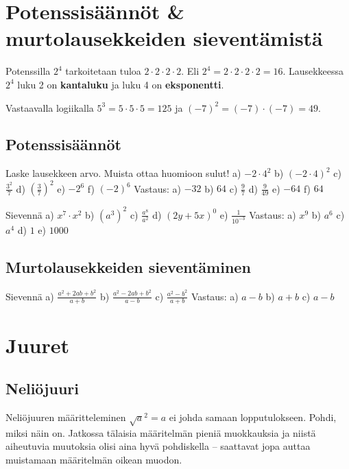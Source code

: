 \chapter{Potenssisäännöt \& murtolausekkeiden sieventämistä}
Potenssilla $2^4$ tarkoitetaan tuloa $2\cdot 2\cdot 2\cdot 2$. Eli $2^4=2\cdot 2\cdot 2\cdot 2=16$. Lausekkeessa $2^4$ luku 2 on \textbf{kantaluku} ja luku 4 on \textbf{eksponentti}.

Vastaavalla logiikalla $5^3=5\cdot 5\cdot 5=125$ ja $(-7)^2=(-7)\cdot (-7)=49$.

\section{Potenssisäännöt}

Laske lausekkeen arvo. Muista ottaa huomioon sulut!
a) $-2\cdot 4^2$
b) $(-2\cdot 4)^2$
c) $\frac{3^2}{7}$
d) $\left( \frac{3}{7} \right)^2$
e) $-2^6$
f) $(-2)^6$
Vastaus:
a) $-32$
b) $64$
c) $\frac{9}{7}$
d) $\frac{9}{49}$
e) $-64$
f) $64$

Sievennä
a) $x^7\cdot x^2$
b) $(a^3)^2$
c) $\frac{a^8}{a^2}$
d) $(2y+5x)^0$
e) $\frac{1}{10^{-3}}$
Vastaus:
a) $x^9$
b) $a^6$
c) $a^4$
d) $1$
e) $1000$

\section{Murtolausekkeiden sieventäminen}

Sievennä
a) $\frac{a^2+2ab+b^2}{a+b}$
b) $\frac{a^2-2ab+b^2}{a-b}$
c) $\frac{a^2-b^2}{a+b}$
Vastaus:
a) $a-b$
b) $a+b$
c) $a-b$

\chapter{Juuret}

\section{Neliöjuuri}


Neliöjuuren määritteleminen $\sqrt{a}^2=a$ ei johda samaan lopputulokseen. Pohdi, miksi näin on.
Jatkossa tälaisia määritelmän pieniä muokkauksia ja niistä aiheutuvia muutoksia olisi aina hyvä pohdiskella -- saattavat jopa auttaa muistamaan määritelmän oikean muodon.


